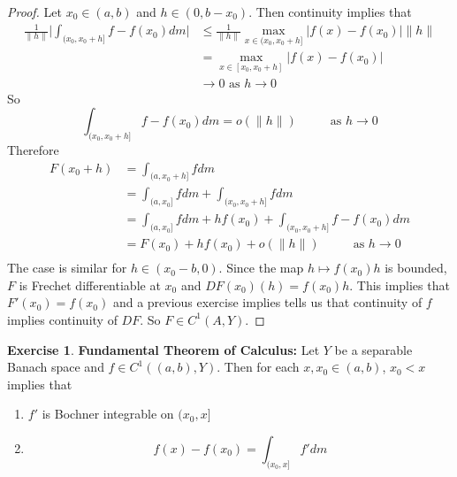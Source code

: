 \documentclass[12pt]{amsart}
\theoremstyle{definition}
\newtheorem{ex}[definition]{Exercise}
\newcommand{\tbf}[1]{\textbf{#1}}
\DeclareMathOperator*{\0}{\mbf{0}}
\DeclareMathOperator*{\1}{\mbf{1}}
\newcommand{\lex}[1]{\label{ex:#1}}
\begin{document}
	\begin{proof}
	Let $x_0 \in (a,b)$ and $h \in (0, b-x_0)$. Then continuity implies that
	\begin{align*}
	\frac{1}{\|h\|} \bigg | \int_{(x_0, x_0 + h]}f - f(x_0) dm \bigg |
	& \leq  \frac{1}{\|h\|} \max_{x \in (x_0, x_0+h]} |f(x) - f(x_0)| \|h\| \\
	&= \max_{x \in [x_0, x_0+h]} |f(x) - f(x_0)| \\
	& \rightarrow 0  \text{ as } h \rightarrow 0
\end{align*}	  
So $$\int_{(x_0, x_0 + h]}f - f(x_0) dm = o(\|h\|) \hspace{1cm}\text{ as }h \rightarrow 0$$ 
	Therefore 
	\begin{align*}
	F(x_0 + h)
	&= \int_{(a, x_0 + h]} f dm  \\
	&= \int_{(a, x_0]} f dm + \int_{(x_0, x_0 + h]} fdm \\
	&= \int_{(a, x_0]} f dm + hf(x_0) + \int_{(x_0, x_0 + h]} f - f(x_0) dm \\ 
	&= F(x_0 ) + hf(x_0) + o(\|h\|) \hspace{1cm }\text{ as } h \rightarrow 0\\
	\end{align*}
	The case is similar for $h \in (x_0 - b, 0)$. Since the map $h \mapsto f(x_0)h$ is bounded, $F$ is Frechet differentiable at $x_0$ and $DF(x_0)(h) = f(x_0)h$. This implies that $F'(x_0) = f(x_0)$ and a previous exercise implies tells us that continuity of $f$ implies continuity of $DF$. So $F \in C^1(A, Y)$.
	\end{proof}
	
	\begin{ex} \lex{}\tbf{Fundamental Theorem of Calculus:}
	Let $Y$ be a separable Banach space and $f \in C^1((a,b), Y)$. Then for each $x, x_0 \in (a,b)$, $x_0 < x$ implies that 
	\begin{enumerate}
	\item $f'$ is Bochner integrable on $(x_0, x]$ 
	\item  $$f(x) - f(x_0) = \int_{(x_0, x]}f'dm$$ 
	\end{enumerate}
	\end{ex}
\end{document}
